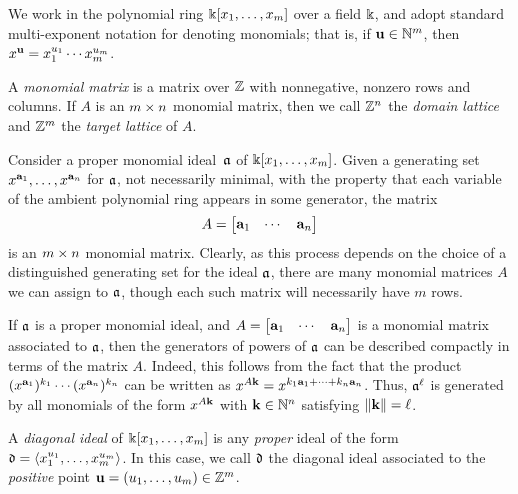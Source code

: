 \documentclass{amsart}
\begin{document}
We work in the polynomial ring $\Bbbk[x_1, \ldots, x_m]$ over a field $\Bbbk$, and adopt standard multi-exponent notation for denoting monomials; that is, if $\mathbf{u} \in \mathbb{N}^m$, then $x^{\mathbf{u}} = x_1^{u_1} \cdots x_m^{u_m}$.

\begin{definition}
\label{monomial matrix: D}
A \emph{monomial matrix} is a matrix over $\mathbb{Z}$ with nonnegative, nonzero rows and columns.
If $A$ is an $m \times n$ monomial matrix, then we call $\mathbb{Z}^n$ the \emph{domain lattice} and $\mathbb{Z}^m$ the \emph{target lattice} of $A$.
\end{definition}

\begin{remark}
   \label{monomial matrix ideal: R}
   Consider a proper monomial ideal~$\mathfrak{a}$ of $\Bbbk[x_1, \ldots, x_{m}]$.
   Given a generating set $x^{\mathbf{a}_1}, \ldots, x^{\mathbf{a}_n}$ for $\mathfrak{a}$, not necessarily minimal, with the property that each variable of the ambient polynomial ring appears in some generator, the matrix
   \[
      A= \begin{bmatrix} \mathbf{a}_1 & \cdots & \mathbf{a}_n \end{bmatrix}
   \]
   is an  $m \times n$ monomial matrix.
   Clearly, as this process depends on the choice of a distinguished generating set for the ideal $\mathfrak{a}$, there are many monomial matrices $A$ we can assign to $\mathfrak{a}$, though each such matrix will necessarily have $m$ rows.
\end{remark}

\begin{remark}
   \label{generators-via-exponent-matrix: R}
   If $\mathfrak{a}$ is a proper monomial ideal, and $A= \begin{bmatrix} \mathbf{a}_1 & \cdots & \mathbf{a}_n \end{bmatrix}$ is a monomial matrix associated to $\mathfrak{a}$, then the generators of powers of $\mathfrak{a}$ can be described compactly in terms of the matrix $A$.
   Indeed, this follows from the fact that the product $(x^{\mathbf{a}_1})^{k_1} \cdots (x^{\mathbf{a}_n})^{k_n}$ can be written as $x^{A \mathbf{k}} = x^{k_1 \mathbf{a}_1 + \cdots + k_n \mathbf{a}_n}$.
   Thus, $\mathfrak{a}^\ell$ is generated by all monomials of the form $x^{A \mathbf{k}}$ with $\mathbf{k} \in \mathbb{N}^n$ satisfying $\| \mathbf{k} \| = \ell$.
\end{remark}

\begin{definition}
   A  \emph{diagonal ideal} of $\Bbbk[x_1, \ldots, x_{m}]$ is any \emph{proper} ideal of the form $\mathfrak{d} = \langle x_1^{u_1}, \ldots, x_{m}^{u_{m}} \rangle$.
   In this case,  we call $\mathfrak{d}$ the diagonal ideal associated to the \emph{positive} point $\mathbf{u} = (u_1, \ldots, u_{m}) \in \mathbb{Z}^{m}$.
\end{definition}
\end{document}
